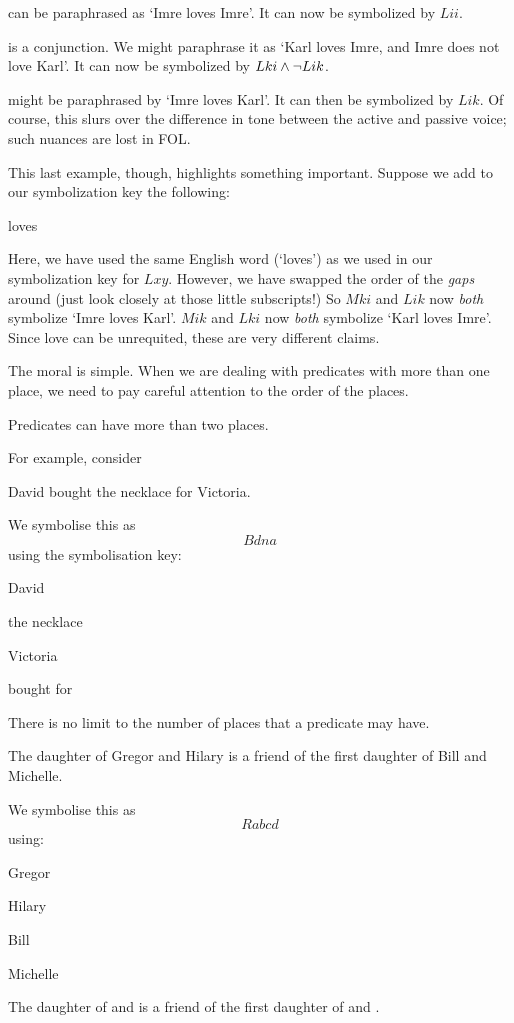  can be paraphrased as `Imre loves Imre'. It can now be symbolized by $Lii$.

 is a conjunction. We might paraphrase it as `Karl loves Imre, and Imre does not love Karl'. It can now be symbolized by $Lki \mathbin{\wedge} \neg Lik$.

 might be paraphrased by `Imre loves Karl'. It can then be symbolized by $Lik$. Of course, this slurs over the difference in tone between the active and passive voice; such nuances are lost in FOL.

This last example, though, highlights something important. Suppose we add to our symbolization key the following:
	\begin{ekey}
		\item[Mxy]  loves 
	\end{ekey}
Here, we have used the same English word (`loves') as we used in our symbolization key for $Lxy$. However, we have swapped the order of the \emph{gaps} around (just look closely at those little subscripts!) So $Mki$ and $Lik$ now \emph{both} symbolize `Imre loves Karl'. $Mik$ and $Lki$ now \emph{both} symbolize `Karl loves Imre'. Since love can be unrequited, these are very different claims.

The moral is simple. When we are dealing with predicates with more than one place, we need to pay careful attention to the order of the places.




Predicates can have more than two places.

For example, consider
\begin{samplesent}
\item\label{sent:folbought} David bought the necklace for Victoria.
\end{samplesent}
We symbolise this as $$Bdna$$ using the symbolisation key:
\begin{ekey}
\item[d] David
\item[n] the necklace
\item[a] Victoria
\item[Rxyz]  bought  for 
\end{ekey}

There is no limit to the number of places that a predicate may have.
\begin{samplesent}
\item\label{sent:folmulti} The daughter of Gregor and Hilary is a friend of the first daughter of Bill and Michelle.
\end{samplesent}
We symbolise this as $$Rabcd$$ using:
\begin{ekey}
\item[a] Gregor
\item[b] Hilary
\item[c] Bill
\item[d] Michelle
\item[Rx_1x_2x_3x_4] The daughter of  and  is a friend of the first daughter of  and .
\end{ekey}






